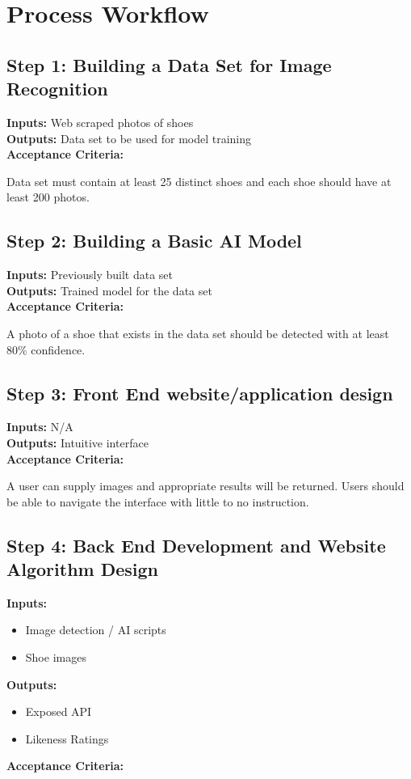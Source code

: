 \documentclass[12pt, titlepage]{article}
\begin{document}
\section{Process Workflow}
\subsection{Step 1: Building a Data Set for Image Recognition}
\textbf{Inputs:}
Web scraped photos of shoes \\
\textbf{Outputs:}
Data set to be used for model training \\
\textbf {Acceptance Criteria:}

Data set must contain at least 25 distinct shoes and each shoe should have at least 200 photos.

\subsection{Step 2: Building a Basic AI Model}
\textbf{Inputs: }
Previously built data set \\
\textbf{Outputs: }
Trained model for the data set \\
\textbf{Acceptance Criteria: }

A photo of a shoe that exists in the data set should be detected with at least 80\% confidence.

\subsection{Step 3: Front End website/application design}
\textbf{Inputs: }
N/A \\
\textbf{Outputs: }
Intuitive interface \\
\textbf{Acceptance Criteria: }

A user can supply images and appropriate results will be returned. Users should be able to navigate the interface with little to no instruction.

\subsection{Step 4: Back End Development and Website Algorithm Design}
\textbf{Inputs: } 
\begin{itemize}
    \item Image detection / AI scripts
    \item Shoe images
\end{itemize}
\textbf{Outputs: } 
\begin{itemize}
    \item Exposed API
    \item Likeness Ratings
\end{itemize}
\textbf{Acceptance Criteria: }
\end{document}
